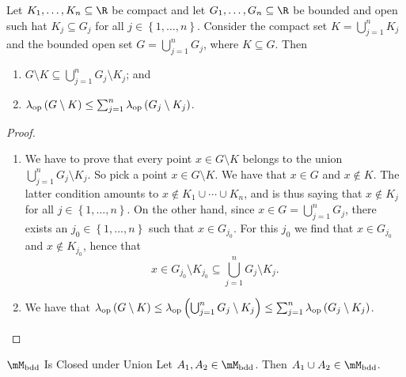 \documentclass[pmath450]{subfiles}
\begin{document}
    \begin{lemma}{}
        Let $K_1,\ldots,K_n\subseteq\R$ be compact and let $G_1,\ldots,G_n\subseteq\R$ be bounded and open such hat $K_j\subseteq G_j$ for all $j\in\left\lbrace 1,\ldots,n \right\rbrace$. Consider the compact set $K=\bigcup^{n}_{j=1}K_j$ and the bounded open set $G=\bigcup^{n}_{j=1}G_j$, where $K\subseteq G$. Then
        \begin{enumerate}
            \item $G\setminus K\subseteq\bigcup^{n}_{j=1}G_j\setminus K_j$; and
            \item $\lambda_{\operatorname{op}}\left( G\setminus K \right)\leq\sum^{n}_{j=1}\lambda_{\operatorname{op}}\left( G_j\setminus K_j \right)$.
        \end{enumerate}
    \end{lemma}

    \begin{proof}
        \begin{enumerate}
            \item We have to prove that every point $x\in G\setminus K$ belongs to the union $\bigcup^{n}_{j=1}G_j\setminus K_j$. So pick a point $x\in G\setminus K$. We have that $x\in G$ and $x\notin K$. The latter condition amounts to $x\notin K_1\cup\cdots\cup K_n$, and is thus saying that $x\notin K_j$ for all $j\in\left\lbrace 1,\ldots,n \right\rbrace$. On the other hand, since $x\in G=\bigcup^{n}_{j=1}G_j$, there exists an $j_0\in\left\lbrace 1,\ldots,n \right\rbrace$ such that $x\in G_{j_0}$. For this $j_0$ we find that $x\in G_{j_0}$ and $x\notin K_{j_0}$, hence that
                \begin{equation*}
                    x\in G_{j_0}\setminus K_{j_0} \subseteq \bigcup^{n}_{j=1}G_j\setminus K_j.
                \end{equation*}
            \item We have that $\lambda_{\operatorname{op}}\left( G\setminus K \right)\leq\lambda_{\operatorname{op}}\left( \bigcup^{n}_{j=1}G_j\setminus K_j \right)\leq\sum^{n}_{j=1}\lambda_{\operatorname{op}}\left( G_j\setminus K_j \right)$.
        \end{enumerate}
    \end{proof}

    \clearpage
    \begin{prop}{$\mM_{\bdd}$ Is Closed under Union}
        Let $A_1,A_2\in\mM_{\bdd}$. Then $A_1\cup A_2\in\mM_{\bdd}$.
    \end{prop}
\end{document}
